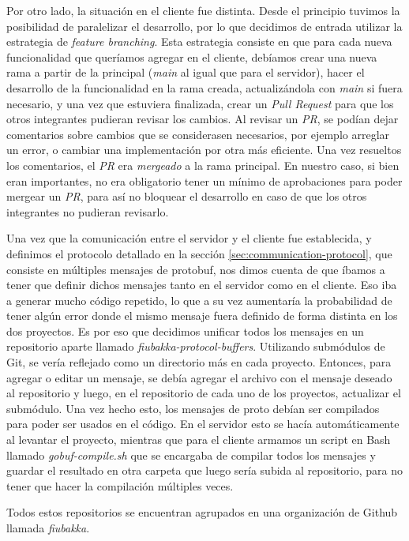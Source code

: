 Por otro lado, la situación en el cliente fue distinta. Desde el principio tuvimos la posibilidad de paralelizar el desarrollo, por lo que 
decidimos de entrada utilizar la estrategia de \textit{feature branching}. Esta estrategia consiste en que para cada nueva funcionalidad
que queríamos agregar en el cliente, debíamos crear una nueva rama a partir de la principal (\textit{main} al igual que para el servidor),
hacer el desarrollo de la funcionalidad en la rama creada, actualizándola con \textit{main} si fuera necesario, y una vez que estuviera finalizada,
crear un \textit{Pull Request} para que los otros integrantes pudieran revisar los cambios. Al revisar un \textit{PR}, se podían dejar comentarios
sobre cambios que se considerasen necesarios, por ejemplo arreglar un error, o cambiar una implementación por otra más eficiente. Una vez resueltos
los comentarios, el \textit{PR} era \textit{mergeado} a la rama principal. En nuestro caso, si bien eran importantes, no era obligatorio tener un mínimo de aprobaciones para poder mergear un \textit{PR},
para así no bloquear el desarrollo en caso de que los otros integrantes no pudieran revisarlo.


Una vez que la comunicación entre el servidor y el cliente fue establecida, y definimos el protocolo detallado en la sección \ref{sec:communication-protocol}, que consiste en
múltiples mensajes de protobuf, nos dimos cuenta de que íbamos a tener que definir dichos mensajes tanto en el servidor como en el cliente. Eso iba
a generar mucho código repetido, lo que a su vez aumentaría la probabilidad de tener algún error donde el mismo mensaje fuera definido de
forma distinta en los dos proyectos. Es por eso que decidimos unificar todos los mensajes en un repositorio aparte llamado \textit{fiubakka-protocol-buffers}. Utilizando submódulos
de Git, se vería reflejado como un directorio más en cada proyecto.
Entonces, para agregar o editar un mensaje, se debía agregar el archivo con el mensaje deseado al repositorio y luego, en el repositorio de cada uno de los proyectos, 
actualizar el submódulo. Una vez hecho esto, los mensajes de proto debían ser compilados para poder
ser usados en el código. En el servidor esto se hacía automáticamente al levantar el proyecto, mientras que para el cliente armamos un
script en Bash llamado \textit{gobuf-compile.sh} que se encargaba de compilar todos los mensajes y guardar el resultado en otra carpeta que 
luego sería subida al repositorio, para no tener que hacer la compilación múltiples veces.

Todos estos repositorios se encuentran agrupados en una organización de Github llamada \textit{fiubakka}.

